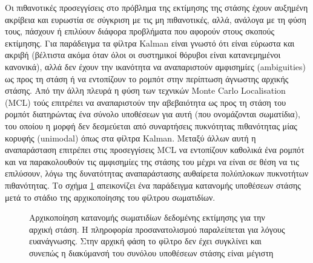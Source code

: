 Οι πιθανοτικές προσεγγίσεις στο πρόβλημα της εκτίμησης της στάσης έχουν
αυξημένη ακρίβεια και ευρωστία σε σύγκριση με τις μη πιθανοτικές, αλλά, ανάλογα
με τη φύση τους, πάσχουν ή επιλύουν διάφορα προβλήματα που αφορούν στους
σκοπούς εκτίμησης. Για παράδειγμα τα φίλτρα Kalman είναι γνωστό ότι είναι
εύρωστα και ακριβή (βέλτιστα ακόμα όταν όλοι οι συστημικοί θόρυβοι είναι
κατανεμημένοι κανονικά), αλλά δεν έχουν την ικανότητα να αναπαριστούν
αμφισημίες (ambiguities) ως προς τη στάση ή να εντοπίζουν το ρομπότ στην
περίπτωση άγνωστης αρχικής στάσης. Από την άλλη πλευρά η φύση των τεχνικών Monte
Carlo Localisation (MCL) \cite{Dellaert} τούς επιτρέπει να αναπαριστούν την
αβεβαιότητα ως προς τη στάση του ρομπότ διατηρώντας ένα σύνολο υποθέσεων για
αυτή (που ονομάζονται σωματίδια), του οποίου η μορφή δεν δεσμεύεται από
συναρτήσεις πυκνότητας πιθανότητας μίας κορυφής (unimodal) όπως στα φίλτρα
Kalman. Μεταξύ άλλων αυτή η αναπαράσταση επιτρέπει στις προσεγγίσεις MCL να
εντοπίζουν καθολικά ένα ρομπότ και να παρακολουθούν τις αμφισημίες της στάσης
του μέχρι να είναι σε θέση να τις επιλύσουν, λόγω της δυνατότητας αναπαράστασης
αυθαίρετα πολύπλοκων πυκνοτήτων πιθανότητας. Το σχήμα \ref{fig:pf_init}
απεικονίζει ένα παράδειγμα κατανομής υποθέσεων στάσης μετά το στάδιο της
αρχικοποίησης του φίλτρου σωματιδίων.

\begin{figure}[htbp]\centering
  
  \caption{\small Αρχικοποίηση κατανομής σωματιδίων δεδομένης εκτίμησης για την
           αρχική στάση. Η πληροφορία προσανατολισμού παραλείπεται για λόγους
           ευανάγνωσης. Στην αρχική φάση το φίλτρο δεν έχει συγκλίνει και
           συνεπώς η διακύμανσή του συνόλου υποθέσεων στάσης είναι μέγιστη}
  \label{fig:pf_init}
\end{figure}

